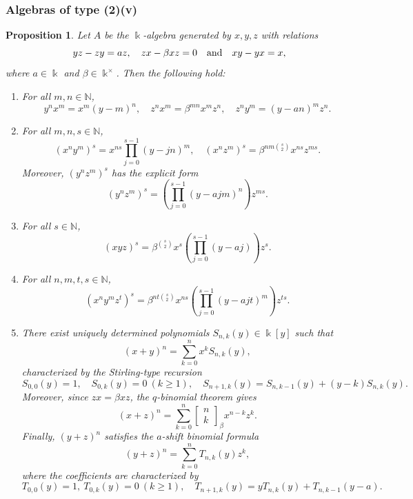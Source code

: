 \documentclass{amsart}
\newtheorem{proposition}[theorem]{Proposition}
\theoremstyle{definition}
\theoremstyle{remark}
\numberwithin{equation}{section}
\begin{document}
\subsubsection{Algebras of type (2)(v)}

\begin{proposition}\label{case(2)(v)}
Let $A$ be the $\Bbbk$-algebra generated by $x,y,z$ with relations
\[
yz - zy = az, \quad zx -\beta xz = 0 \quad {\rm and} \quad xy - yx = x,
\]
where $a\in\Bbbk$ and $\beta\in\Bbbk^{\times}$. Then the following hold:
\begin{enumerate}
\item[\rm (1)] For all $m,n\in \mathbb{N}$,
\[
y^n x^m=x^m (y-m)^n,\quad z^n x^m=\beta^{mn}x^m z^n,\quad z^n y^m=(y-an)^m z^n.
\]

\item[\rm (2)] For all $m,n,s\in \mathbb{N}$,
\[
(x^n y^m)^s=x^{ns}\prod_{j=0}^{s-1}(y-jn)^m,
\quad
(x^n z^m)^s=\beta^{nm\binom{s}{2}} x^{ns}z^{ms}.
\]
Moreover, $(y^n z^m)^s$ has the explicit form
\begin{equation}\label{ynzmpowercase2v}
(y^n z^m)^s=\left(\prod_{j=0}^{s-1}(y-ajm)^n\right)z^{ms}.
\end{equation}

\item[\rm (3)] For all $s\in \mathbb{N}$,
\begin{equation}\label{xyz_power_case2v}
(xyz)^s =\beta^{\binom{s}{2}}x^{s}\left(\prod_{j=0}^{s-1}(y-aj)\right)z^{s}.
\end{equation}

\item[\rm (4)] For all $n,m,t,s\in \mathbb{N}$,
\begin{equation}\label{blockpowercase2v}
(x^n y^m z^t)^s =\beta^{nt\binom{s}{2}}x^{ns}\left(\prod_{j=0}^{s-1}(y-ajt)^m\right)z^{ts}.
\end{equation}

\item[\rm (5)] 
There exist uniquely determined polynomials $S_{n,k}(y)\in\Bbbk[y]$ such that
\[
(x+y)^n=\sum_{k=0}^{n}x^{k}S_{n,k}(y),
\]
characterized by the Stirling-type recursion
\[
S_{0,0}(y)=1, \quad S_{0,k}(y)=0\ (k\ge 1), \quad S_{n+1,k}(y)=S_{n,k-1}(y)+(y-k) S_{n,k}(y).
\]
Moreover, since $zx=\beta xz$, the $q$-binomial theorem gives
\[
(x+z)^n=\sum_{k=0}^{n}\begin{bmatrix} n\\ k\end{bmatrix}_{\beta} x^{n-k}z^{k}.
\]
Finally, $(y+z)^n$ satisfies the $a$-shift binomial formula
\[
(y+z)^n=\sum_{k=0}^{n}T_{n,k}(y) z^{k},
\]
where the coefficients are characterized by
\[
T_{0,0}(y)=1,\ T_{0,k}(y)=0\ (k\ge 1),\quad T_{n+1,k}(y)=yT_{n,k}(y)+T_{n,k-1}(y-a).
\]
\end{enumerate}
\end{proposition}
\end{document}
